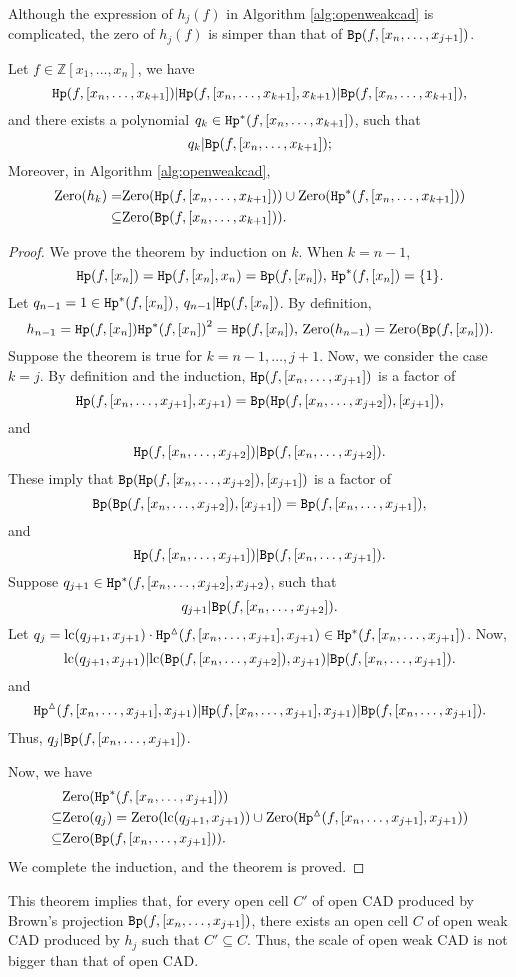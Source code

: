 \documentclass[amsthm]{elsart}
\def \lc  {{\rm lc}}
\def \Bproj  {{\tt Bp}}
\def  \zero {{\rm Zero}}
\def  \Hproj {{\tt Hp}}
\def \ZZ {{\mathbb Z}}
\begin{document}
Although the expression of $h_j(f)$ in Algorithm \ref{alg:openweakcad} is complicated, the zero of $h_j(f)$ is simper than that of $\Bproj(f,[x_n,\ldots,x_{j+1}])$.
\begin{thm}\label{thm:smhp}Let $f\in\ZZ[x_1,\ldots,x_n]$, we have
$$\Hproj(f,[x_n,\ldots,x_{k+1}])|\Hproj(f,[x_n,\ldots,x_{k+1}],x_{k+1})|\Bproj(f,[x_n,\ldots,x_{k+1}]),$$
and there exists a polynomial $q_k\in {\Hproj^{\ast}(f,[x_n,\ldots,x_{k+1}])}$, such that $$q_k|\Bproj(f,[x_n,\ldots,x_{k+1}]);$$
Moreover, in Algorithm \ref{alg:openweakcad},
\begin{align*}
\zero(h_k)=&\zero(\Hproj(f,[x_n,\ldots,x_{k+1}]))\cup\zero({\Hproj^{\ast}(f,[x_n,\ldots,x_{k+1}])})\\
\subseteq&\zero(\Bproj(f,[x_n,\ldots,x_{k+1}])).
\end{align*}
\end{thm}
\begin{proof}
We prove the theorem by induction on $k$. When $k=n-1$,
$$\Hproj(f,[x_n])=\Hproj(f,[x_n],x_n)=\Bproj(f,[x_n]),\,{\Hproj^{\ast}(f,[x_n])}=\{1\}.$$
Let $q_{n-1}=1\in {\Hproj^{\ast}(f,[x_n])}$, $q_{n-1}|\Hproj(f,[x_n])$. By definition, $$h_{n-1}=\Hproj(f,[x_n]){\Hproj^{\ast}(f,[x_n])}^2=\Hproj(f,[x_n]),\, \zero(h_{n-1})=\zero(\Bproj(f,[x_n])).$$
Suppose the theorem is true for $k=n-1,\ldots,j+1$. Now, we consider the case $k=j$. By definition and the induction, $\Hproj(f,[x_n,\ldots,x_{j+1}])$ is a factor of $$\Hproj(f,[x_n,\ldots,x_{j+1}],x_{j+1})=\Bproj(\Hproj(f,[x_n,\ldots,x_{j+2}]),[x_{j+1}]),$$
and
$$\Hproj(f,[x_n,\ldots,x_{j+2}])|\Bproj(f,[x_n,\ldots,x_{j+2}]).$$
These imply that
$\Bproj(\Hproj(f,[x_n,\ldots,x_{j+2}]),[x_{j+1}])$ is a factor of $$\Bproj(\Bproj(f,[x_n,\ldots,x_{j+2}]),[x_{j+1}])=\Bproj(f,[x_n,\ldots,x_{j+1}]),$$ and
$$\Hproj(f,[x_n,\ldots,x_{j+1}])|\Bproj(f,[x_n,\ldots,x_{j+1}]).$$
Suppose $q_{j+1}\in {\Hproj^{\ast}(f,[x_n,\ldots,x_{j+2}],x_{j+2})}$, such that
 $$q_{j+1}|\Bproj(f,[x_n,\ldots,x_{j+2}]).$$
 Let $q_j=\lc(q_{j+1},x_{j+1})\cdot{\Hproj^{\vartriangle}(f,[x_n,\ldots,x_{j+1}],x_{j+1})}\in {\Hproj^{\ast}(f,[x_n,\ldots,x_{j+1}])}$.
 Now,
  $$\lc(q_{j+1},x_{j+1})|\lc(\Bproj(f,[x_n,\ldots,x_{j+2}]),x_{j+1})|\Bproj(f,[x_n,\ldots,x_{j+1}]).$$
 and
$${\Hproj^{\vartriangle}(f,[x_n,\ldots,x_{j+1}],x_{j+1})}|\Hproj(f,[x_n,\ldots,x_{j+1}],x_{j+1})|\Bproj(f,[x_n,\ldots,x_{j+1}]).$$
Thus, $q_j|\Bproj(f,[x_n,\ldots,x_{j+1}])$.

Now, we have
\begin{align*}
&\zero({\Hproj^{\ast}(f,[x_n,\ldots,x_{j+1}])})\\
\subseteq &\zero(q_j)=\zero(\lc(q_{j+1},x_{j+1}))\cup\zero({\Hproj^{\vartriangle}(f,[x_n,\ldots,x_{j+1}],x_{j+1})})\\
\subseteq&\zero(\Bproj(f,[x_n,\ldots,x_{j+1}])).
\end{align*}
We complete the induction, and the theorem is proved.
\end{proof}
 This theorem implies that, for every open cell $C'$ of open CAD produced by Brown's projection $\Bproj(f,[x_n,\ldots,x_{j+1}])$, there exists an open cell $C$ of open weak CAD produced by $h_j$ such that $C'\subseteq C$. Thus, the scale of open weak CAD is not bigger than that of open CAD.
\end{document}
